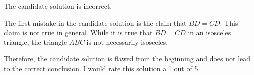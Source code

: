 The candidate solution is incorrect.

The first mistake in the candidate solution is the claim that $BD = CD$. This claim is not true in general. While it is true that $BD = CD$ in an isosceles triangle, the triangle $ABC$ is not necessarily isosceles.

Therefore, the candidate solution is flawed from the beginning and does not lead to the correct conclusion. I would rate this solution a 1 out of 5.

